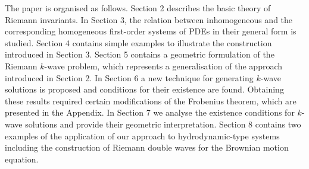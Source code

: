 \documentclass{birkjour}
\theoremstyle{definition}
\theoremstyle{remark}
\numberwithin{equation}{section}
\numberwithin{equation}{section}
\numberwithin{thm}{section}
\numberwithin{equation}{section}
\numberwithin{thm}{section}
\begin{document}
The paper is organised as follows. Section 2 describes the basic theory of Riemann invariants. In Section 3, the relation  between inhomogeneous and the corresponding homogeneous first-order systems of PDEs in their general form is studied. Section 4 contains simple examples to illustrate the construction introduced in Section 3. Section 5 contains a geometric formulation of the Riemann $k$-wave problem, which represents a generalisation of the approach introduced in Section 2. In Section 6 a new technique for generating $k$-wave solutions   is proposed  and conditions for their existence are found. Obtaining these results required certain modifications of the Frobenius theorem, which are presented in the Appendix. In Section 7 we analyse the existence conditions for $k$-wave solutions and provide their geometric interpretation. Section 8 contains two examples of the application of our approach to hydrodynamic-type systems including the construction of Riemann double waves for the Brownian motion equation.

\end{document}
